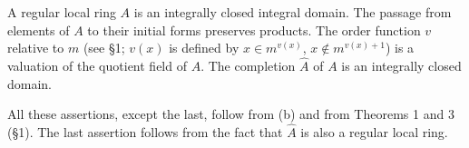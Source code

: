 A regular local ring $A$ is an integrally closed integral domain. The passage from elements of $A$ to their initial forms preserves products. The order function $v$ relative to $m$ (see §1; $v(x)$ is defined by $x \in m^{v(x)}$, $x \notin m^{v(x)+1}$) is a valuation of the quotient field of $A$. The completion $\hat{A}$ of $A$ is an integrally closed domain.

All these assertions, except the last, follow from (b) and from Theorems 1 and 3 (§1). The last assertion follows from the fact that $\hat{A}$ is also a regular local ring.